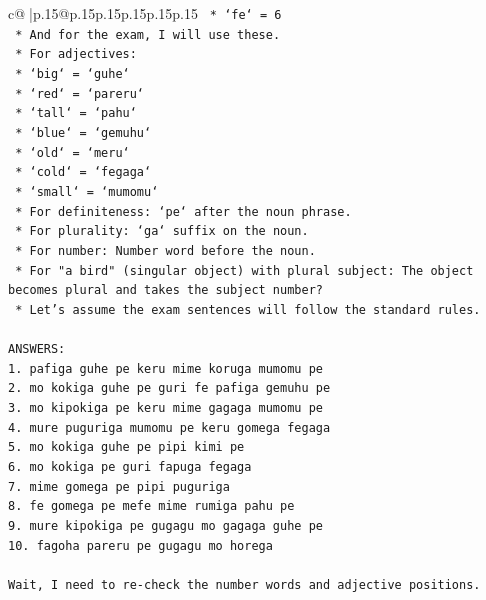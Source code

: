 \documentclass{article}
\begin{document}
{\begin{supertabular}{c@{$\;$}|p{.15\linewidth}@{}p{.15\linewidth}p{.15\linewidth}p{.15\linewidth}p{.15\linewidth}p{.15\linewidth}}
{{{\texttt{        *   `fe` = 6} \\
\texttt{    *   And for the exam, I will use these.} \\
\texttt{    *   For adjectives:} \\
\texttt{        *   `big` = `guhe`} \\
\texttt{        *   `red` = `pareru`} \\
\texttt{        *   `tall` = `pahu`} \\
\texttt{        *   `blue` = `gemuhu`} \\
\texttt{        *   `old` = `meru`} \\
\texttt{        *   `cold` = `fegaga`} \\
\texttt{        *   `small` = `mumomu`} \\
\texttt{    *   For definiteness: `pe` after the noun phrase.} \\
\texttt{    *   For plurality: `ga` suffix on the noun.} \\
\texttt{    *   For number: Number word before the noun.} \\
\texttt{    *   For "a bird" (singular object) with plural subject: The object becomes plural and takes the subject number?} \\
\texttt{    *   Let's assume the exam sentences will follow the standard rules.} \\
\\ 
\texttt{ANSWERS:} \\
\texttt{1. pafiga guhe pe keru mime koruga mumomu pe} \\
\texttt{2. mo kokiga guhe pe guri fe pafiga gemuhu pe} \\
\texttt{3. mo kipokiga pe keru mime gagaga mumomu pe} \\
\texttt{4. mure puguriga mumomu pe keru gomega fegaga} \\
\texttt{5. mo kokiga guhe pe pipi kimi pe} \\
\texttt{6. mo kokiga pe guri fapuga fegaga} \\
\texttt{7. mime gomega pe pipi puguriga} \\
\texttt{8. fe gomega pe mefe mime rumiga pahu pe} \\
\texttt{9. mure kipokiga pe gugagu mo gagaga guhe pe} \\
\texttt{10. fagoha pareru pe gugagu mo horega} \\
\\ 
\texttt{Wait, I need to re{-}check the number words and adjective positions.} \\
}}}
\end{supertabular}}
\end{document}
